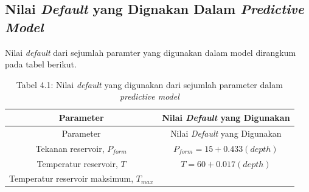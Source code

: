 \documentclass[
]{book}
\begin{document}
\hypertarget{nilai-default-yang-dignakan-dalam-predictive-model}{%
\subsection{\texorpdfstring{Nilai \emph{Default} yang Dignakan Dalam \emph{Predictive Model}}{Nilai Default yang Dignakan Dalam Predictive Model}}\label{nilai-default-yang-dignakan-dalam-predictive-model}}

Nilai \emph{default} dari sejumlah paramter yang digunakan dalam model dirangkum pada tabel berikut.

\begin{longtable}[]{@{}cc@{}}
\caption{{ Tabel 4.1: Nilai \emph{default} yang digunakan dari sejumlah parameter dalam \emph{predictive model} }}\tabularnewline
\toprule
\begin{minipage}[b]{0.47\columnwidth}\centering
Parameter\strut
\end{minipage} & \begin{minipage}[b]{0.47\columnwidth}\centering
Nilai \emph{Default} yang Digunakan\strut
\end{minipage}\tabularnewline
\midrule
\endfirsthead
\toprule
\begin{minipage}[b]{0.47\columnwidth}\centering
Parameter\strut
\end{minipage} & \begin{minipage}[b]{0.47\columnwidth}\centering
Nilai \emph{Default} yang Digunakan\strut
\end{minipage}\tabularnewline
\midrule
\endhead
\begin{minipage}[t]{0.47\columnwidth}\centering
Tekanan reservoir, \(P_{form}\)\strut
\end{minipage} & \begin{minipage}[t]{0.47\columnwidth}\centering
\(P_{form}=15+0.433 (depth)\)\strut
\end{minipage}\tabularnewline
\begin{minipage}[t]{0.47\columnwidth}\centering
Temperatur reservoir, \(T\)\strut
\end{minipage} & \begin{minipage}[t]{0.47\columnwidth}\centering
\(T=60+0.017(depth)\)\strut
\end{minipage}\tabularnewline
\begin{minipage}[t]{0.47\columnwidth}\centering
Temperatur reservoir maksimum, \(T_{max}\)\strut
\end{minipage} & \begin{minipage}[t]{0.47\columnwidth}\centering

\end{minipage}
\end{longtable}
\end{document}
